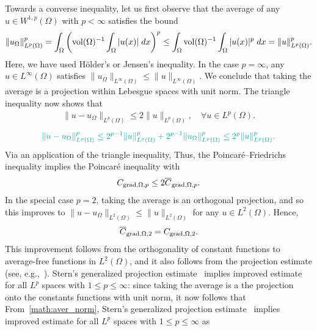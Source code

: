 \documentclass[10pt,a4paper]{article}
\newcommand{\mwl}[1]{{\color{red}#1}}
\begin{document}
Towards a converse inequality, 
let us first observe that the average of any $u \in W^{1,p}(\Omega)$ with $p < \infty$ satisfies the bound 
\begin{align} \label{math:aver_norm}
    \| u_\Omega \|_{L^{p}(\Omega)}^{p}
    = 
    \int_{\Omega} \left( \operatorname{vol}(\Omega)^{-1} \int_{\Omega} |u(x)| \;dx \right)^{p}
    \leq 
    \int_{\Omega} \operatorname{vol}(\Omega)^{-1} \int_{\Omega} |u(x)|^{p} \;dx
    = 
    \| u \|_{L^{p}(\Omega)}^{p}
    .
\end{align}
Here, we have used H\"older's or Jensen's inequality. 
In the case $p = \infty$, any $u \in L^{\infty}(\Omega)$ satisfies $\| u_\Omega \|_{L^{\infty}(\Omega)} \leq \| u \|_{L^{\infty}(\Omega)}$. 
We conclude that taking the average is a projection within Lebesgue spaces with unit norm. 
The triangle inequality now shows that 
\begin{align*}
    \| u - u_\Omega \|_{L^{p}(\Omega)} 
    \leq
    2
    \| u \|_{L^{p}(\Omega)},
    \quad 
    \forall
    u \in L^{p}(\Omega)
    .
\end{align*}
\begin{align*}
    \color{Emerald}
    \| u - u_\Omega \|_{L^{p}(\Omega)}^{p}
    \leq 
    2^{p-1} 
    \| u \|_{L^{p}(\Omega)}^{p}
    +
    2^{p-1} 
    \| u_\Omega \|_{L^{p}(\Omega)}^{p}
    \leq 
    2^{p} 
    \| u \|_{L^{p}(\Omega)}^{p}
    .
\end{align*}
\mwl{Via an application of the triangle inequality, }Thus, the Poincar\'e--Friedrichs inequality implies the Poincar\'e inequality with 
\begin{align*}
    C_{\operatorname{grad},\Omega,p} \leq 2 \overline C_{\operatorname{grad},\Omega,p}.
\end{align*}
In the special case $p=2$, taking the average is an orthogonal projection, 
and so this improves to $\| u - u_\Omega \|_{L^{2}(\Omega)} \leq \| u \|_{L^{2}(\Omega)}$ for any $u \in L^{2}(\Omega)$. 
Hence,
\begin{align*}
    \overline C_{\operatorname{grad},\Omega,2} = C_{\operatorname{grad},\Omega,2}. 
\end{align*}
\mwl{
This improvement follows from the orthogonality of constant functions to average-free functions in $L^2(\Omega)$,
and it also follows from the projection estimate (see, e.g.,~\cite{xu2003some}).
Stern's generalized projection estimate~\cite[Theorem~4.1,Remark~5.1]{stern2015banach} implies improved estimate for all $L^{p}$ spaces with $1 \leq p \leq \infty$:
since taking the average is a the projection onto the constants functions with unit norm, it now follows that 
}
From~\eqref{math:aver_norm}, Stern's generalized projection estimate~\cite[Theorem~4.1, Remark~5.1]{stern2015banach} implies improved estimate for all $L^{p}$ spaces with $1 \leq p \leq \infty$ as 
\end{document}
